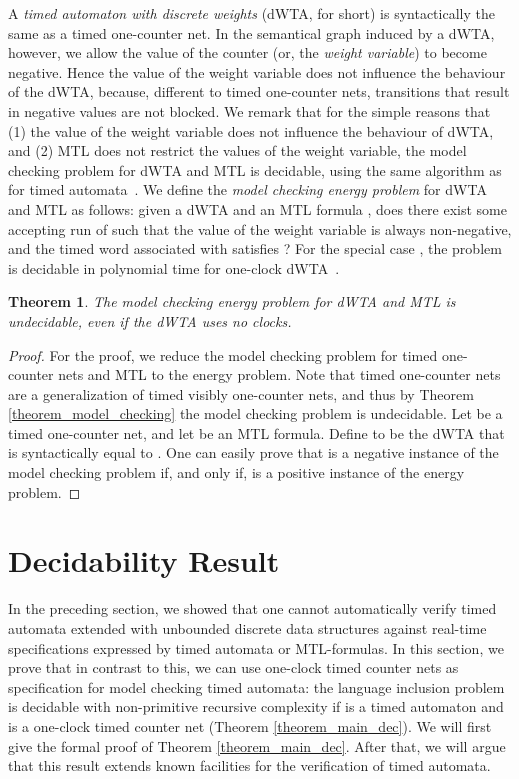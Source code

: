\documentclass{CSML}
\theoremstyle{plain}\newtheorem{theorem}[thm]{Theorem}
\theoremstyle{plain}\newtheorem{corollary}[thm]{Corollary}
\theoremstyle{plain}\newtheorem{example}[thm]{Example}
\theoremstyle{plain}\newtheorem{lemma}[thm]{Lemma}
\theoremstyle{plain}\newtheorem{remark}[thm]{Remark}
\newcommand{\mtl}{MTL }
\begin{document}
A \emph{timed automaton with discrete weights} (dWTA, for short)
is syntactically the same as a timed one-counter net.
	In the semantical graph induced by a dWTA, however, we allow the value of the counter (or, the \emph{weight variable}) to become negative.
	Hence the value of the weight variable does not influence the behaviour of the dWTA, 
	because, different to timed one-counter nets, transitions that result in negative values are not blocked. 
	We remark that for the  simple reasons that (1) the value of the weight variable does not influence the behaviour of dWTA, and (2) MTL does not restrict the values of the weight variable, the model checking problem for dWTA and MTL is decidable, using the same algorithm as for timed automata~\cite{DBLP:conf/lics/OuaknineW05}. 
	We define the \emph{model checking energy problem} for dWTA and \mtl as follows: given a dWTA  and an \mtl formula , does there exist some accepting run  of  such that the value of the weight variable is always non-negative, and the timed word  associated with  satisfies ?	
	For the special case , 
	the problem is decidable in polynomial time for one-clock dWTA~\cite{DBLP:conf/formats/BouyerFLMS08}.
	\begin{theorem}
		\label{theorem_energy}
		The model checking energy problem for dWTA and \mtl is undecidable, even if the dWTA uses no clocks. 
	\end{theorem}
	\begin{proof}		
		For the proof, we reduce the  model checking problem for timed one-counter nets and \mtl to the energy problem. 
		Note that timed one-counter nets are a generalization of timed visibly one-counter nets, and thus by Theorem \ref{theorem_model_checking} the model checking problem is undecidable. 
		Let  be a timed one-counter net, and let  be an \mtl formula. 
		Define  to be the dWTA that is syntactically equal to .
		One can easily prove that  is a negative instance of the model checking problem if, and only if,  is a positive instance of the energy problem. 
	\end{proof}
	


	\section{Decidability Result}
	In the preceding section, we showed that one cannot automatically verify  timed automata extended with unbounded discrete data structures against real-time specifications expressed by timed automata or MTL-formulas. 
	In this section, 
	we prove that in contrast to this, we can use one-clock timed counter nets as specification for model checking timed automata: the language inclusion problem  is decidable with non-primitive recursive complexity if  is a timed automaton and  is a one-clock timed counter net (Theorem \ref{theorem_main_dec}).
	We will first give the formal proof of Theorem \ref{theorem_main_dec}. 
	After that, we will argue that this result extends known facilities for the verification of timed automata. 
	
\end{document}
